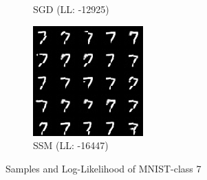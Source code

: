 \begin{figure}[H]
\begin{subfigure}[b]{0.24\textwidth}
        \caption{SGD (LL: -12925)}
    \end{subfigure}
    \begin{subfigure}[b]{0.24\textwidth}
        \centering
        \includegraphics[width=\textwidth]{figures/einsum/7mnist_SSM.png}
        \caption{SSM (LL: -16447)}
    \end{subfigure}
    \caption{Samples and Log-Likelihood of MNIST-class 7}
    \label{fig:mnist7}
\end{figure}

